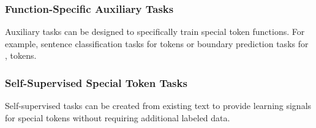 \subsubsection{Function-Specific Auxiliary Tasks}

Auxiliary tasks can be designed to specifically train special token functions. For example, sentence classification tasks for \cls{} tokens or boundary prediction tasks for \sep{} tokens.

\subsubsection{Self-Supervised Special Token Tasks}

Self-supervised tasks can be created from existing text to provide learning signals for special tokens without requiring additional labeled data.